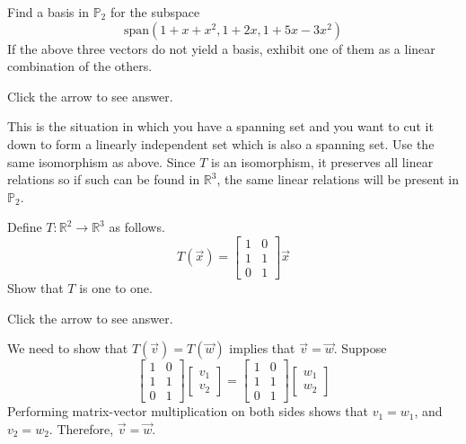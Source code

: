\documentclass{ximera}
\begin{document}
\begin{problem}\label{prb:10.29} Find a basis in $\mathbb{P}_{2}$ for the subspace
\begin{equation*}
\mbox{span}\left( 1+x+x^{2},1+2x,1+5x-3x^{2}\right)
\end{equation*}
If the above three vectors do not yield a basis, exhibit one of them as a
linear combination of the others. 

Click the arrow to see answer.
\begin{expandable}
This is the situation in
which you have a spanning set and you want to cut it down to form a linearly
independent set which is also a spanning set. Use the same isomorphism as
above. Since $T$ is an isomorphism, it preserves all linear relations so if
such can be found in $\mathbb{R}^{3}$, the same linear relations will be
present in $\mathbb{P}_{2}$.
\end{expandable}
\end{problem}

\begin{problem}\label{prb:10.83} Define $T:\mathbb{R}^{2}\rightarrow \mathbb{R}^{3}$ as follows.
\begin{equation*}
T(\vec{x})=\left[
\begin{array}{cc}
1 & 0 \\
1 & 1 \\
0 & 1
\end{array}
\right] \vec{x}
\end{equation*}
Show that $T$ is one to one. 

Click the arrow to see answer.

\begin{expandable}
    We need to show that $T(\vec{v})=T(\vec{w})$ implies that $\vec{v}=\vec{w}$. Suppose $$\begin{bmatrix}1 & 0\\1 & 1\\0& 1\end{bmatrix}\begin{bmatrix}v_1\\v_2\end{bmatrix}=\begin{bmatrix}1 & 0\\1 & 1\\0& 1\end{bmatrix}\begin{bmatrix}w_1\\w_2\end{bmatrix}$$
    Performing matrix-vector multiplication on both sides shows that $v_1=w_1$, and $v_2=w_2$.  Therefore, $\vec{v}=\vec{w}$. 
\end{expandable}

\end{problem}
\end{document}

